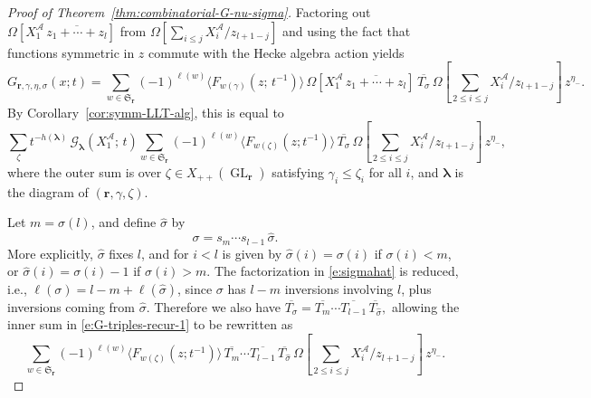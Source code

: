 \documentclass[12pt]{amsart}
\theoremstyle{definition}
\theoremstyle{remark}
\newcommand{\rr}{{\mathbf r}}
\newcommand{\lambold}{{\boldsymbol \lambda }}
\newcommand{\Sfrak}{{\mathfrak S}}
\newcommand{\Acal}{{\mathcal A}}
\newcommand{\Gcal}{{\mathcal G}}
\newcommand{\sigmahat}{\widehat{\sigma }}
\DeclareMathOperator{\GL}{GL}
\begin{document}
\begin{proof}[Proof of Theorem~\ref{thm:combinatorial-G-nu-sigma}]
Factoring out $\Omega [X^\Acal_{1}\, \overline{z_{1}+\cdots +z_{l}}]$ from
$\Omega [\sum _{i\leq j} X^\Acal_{i} /z_{l+1-j}]$ and using the fact that
functions symmetric in $z$ commute with the Hecke algebra action
yields
\begin{equation}\label{e:G-triples-factored}
G_{\rr ,\gamma ,\eta ,\sigma }(x;t) =
\sum _{w\in \Sfrak _{\rr }} (-1)^{\ell (w)} \langle F_{w(\gamma
)}(z;\, t^{-1}) \rangle\, \Omega [X^\Acal_{1}\, \overline{z_{1}+\cdots
+z_{l}}]\, \overline{T_{\sigma }} \, \Omega [\sum _{2\leq i\leq j}
X^\Acal_{i} /z_{l+1-j}] \, z^{\eta _{-}}.
\end{equation}
By Corollary~\ref{cor:symm-LLT-alg}, this is equal to
\begin{equation}\label{e:G-triples-recur-1}
\sum _{\zeta } t^{-h(\lambold )}\, \Gcal _{\lambold }(X^\Acal_{1};\, t) \sum
_{w\in \Sfrak _{\rr }} (-1)^{\ell (w)} \langle F_{w(\zeta )}(z;
t^{-1}) \rangle\, \overline{T_{\sigma }}\, \Omega [\sum _{2\leq i\leq
j} X^\Acal_{i} /z_{l+1-j}] \, z^{\eta _{-}},
\end{equation}
where the outer sum is over $\zeta \in X_{++}(\GL _{\rr})$ satisfying
$\gamma _{i}\leq \zeta _{i}$ for all $i$, and $\lambold $ is the
diagram of $(\rr ,\gamma ,\zeta )$.

Let $m = \sigma (l)$, and define $\sigmahat $ by
\begin{equation}\label{e:sigmahat}
\sigma = s_{m}\cdots s_{l-1}\, \sigmahat.
\end{equation}
More explicitly, $\sigmahat $ fixes $l$, and for $i<l$ is given by
$\sigmahat (i) = \sigma (i)$ if $\sigma (i)<m$, or $\sigmahat (i) =
\sigma (i)-1$ if $\sigma (i)>m$.  The factorization in
\eqref{e:sigmahat} is reduced, i.e., $\ell (\sigma ) = l-m+\ell
(\sigmahat )$, since $\sigma$ has $l-m$ inversions involving $l$, plus
inversions coming from $\sigmahat $.  Therefore we also have
$\overline{T_{\sigma }} = \overline{T_{m}} \cdots \overline{T_{l-1}}
\,\overline{T_{\sigmahat }},$ allowing the inner sum in
\eqref{e:G-triples-recur-1} to be rewritten as
\begin{equation}\label{e:G-triples-recur-2}
\sum _{w\in \Sfrak _{\rr }} (-1)^{\ell (w)} \langle F_{w(\zeta )}(z;
t^{-1}) \rangle\, \overline{T_{m}} \cdots \overline{T_{l-1}}
\,\overline{T_{\sigmahat }}\, \Omega [\sum _{2\leq i\leq j} X^\Acal_{i}
/z_{l+1-j}] \, z^{\eta _{-}}.
\end{equation}


\end{proof}
\end{document}
